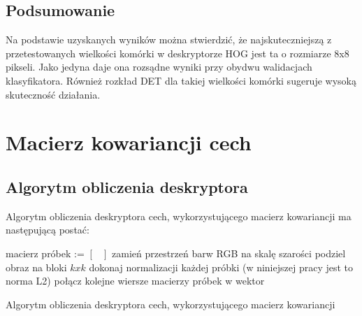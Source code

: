\subsection{Podsumowanie}

Na podstawie uzyskanych wyników można stwierdzić, że najskuteczniejszą z przetestowanych wielkości komórki w deskryptorze HOG jest ta o rozmiarze 8x8 pikseli. Jako jedyna daje ona rozsądne wyniki przy obydwu walidacjach klasyfikatora. Również rozkład DET dla takiej wielkości komórki sugeruje wysoką skuteczność działania.

\clearpage

\section{Macierz kowariancji cech}
\label{sec:cov}

\subsection{Algorytm obliczenia deskryptora}

Algorytm obliczenia deskryptora cech, wykorzystującego macierz kowariancji ma następującą postać:

\begin{algorithm}[H]
 \SetAlgoLined
 macierz próbek := $\left[\begin{array}{ccc}\end{array}\right]$\;
 zamień przestrzeń barw RGB na skalę szarości\;
 podziel obraz na bloki $k x k$\;
 dokonaj normalizacji każdej próbki (w niniejszej pracy jest to norma L2)\;
 połącz kolejne wiersze macierzy próbek w wektor\;
 \;
 \caption{Algorytm obliczenia deskryptora cech, wykorzystującego macierz kowariancji}
\end{algorithm}

